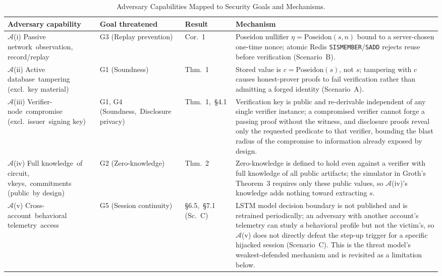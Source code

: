 \documentclass[12pt,a4paper,oneside]{report}
\begin{document}
\begin{table}[htbp]
\renewcommand{\arraystretch}{1.3}
\caption{Adversary Capabilities Mapped to Security Goals and Mechanisms.}
\label{tab:adversary_goal_map}
\centering
\footnotesize
\begin{tabular}{p{3.3cm}p{2.6cm}p{1.0cm}p{4.6cm}}
\toprule
\textbf{Adversary capability} & \textbf{Goal threatened} &
\textbf{Result} & \textbf{Mechanism} \\
\midrule
$\mathcal{A}$(i) Passive network\ observation, record/replay &
G3 (Replay prevention) & Cor.~1 &
Poseidon nullifier $\eta=\mathrm{Poseidon}(s,n)$ bound to a
server-chosen one-time nonce; atomic Redis \texttt{SISMEMBER}/\texttt{SADD}
rejects reuse before verification (Scenario~B). \\[4pt]
$\mathcal{A}$(ii) Active database\ tampering (excl.\ key material) &
G1 (Soundness) & Thm.~1 &
Stored value is $c=\mathrm{Poseidon}(s)$, not $s$; tampering with $c$
causes honest-prover proofs to fail verification rather than admitting
a forged identity (Scenario~A). \\[4pt]
$\mathcal{A}$(iii) Verifier-node\ compromise (excl.\ issuer\ signing key) &
G1, G4 (Soundness,\ Disclosure privacy) & Thm.~1,\ \S4.1 &
Verification key is public and re-derivable independent of any single
verifier instance; a compromised verifier cannot forge a passing proof
without the witness, and disclosure proofs reveal only the requested
predicate to that verifier, bounding the blast radius of the
compromise to information already exposed by design. \\[4pt]
$\mathcal{A}$(iv) Full knowledge\ of circuit, vkeys,\ commitments (public\ by design) &
G2 (Zero-knowledge) & Thm.~2 &
Zero-knowledge is defined to hold even against a verifier with full
knowledge of all public artifacts; the simulator in Groth's Theorem~3
requires only these public values, so $\mathcal{A}$(iv)'s knowledge
adds nothing toward extracting $s$. \\[4pt]
$\mathcal{A}$(v) Cross-account\ behavioral telemetry\ access &
G5 (Session continuity) & \S6.5,\ \S7.1 (Sc.~C) &
LSTM model decision boundary is not published and is retrained
periodically; an adversary with another account's telemetry can study
\emph{a} behavioral profile but not the victim's, so $\mathcal{A}$(v)
does not directly defeat the step-up trigger for a specific hijacked
session (Scenario~C). This is the threat model's weakest-defended
mechanism and is revisited as a limitation below. \\
\bottomrule
\end{tabular}
\end{table}
\end{document}
